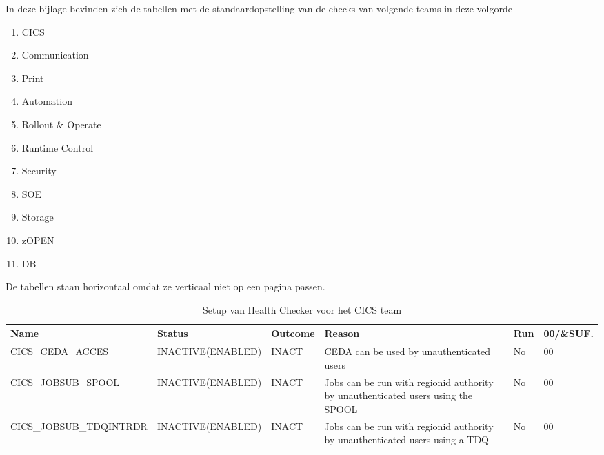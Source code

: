 
In deze bijlage bevinden zich de tabellen met de standaardopstelling van de checks van volgende teams in deze volgorde

\begin{enumerate}
	\item CICS
	\item Communication
	\item Print
	\item Automation
	\item Rollout \& Operate
	\item Runtime Control
	\item Security
	\item SOE
	\item Storage
	\item zOPEN
	\item DB
\end{enumerate}

De tabellen staan horizontaal omdat ze verticaal niet op een pagina passen.

\begin{landscape}
	\begin{table}[h]
		\begin{tabular}{|l|l|l|p{5cm}|l|l|}
			\hline
			\textbf{Name}                    & \textbf{Status}            & \textbf{Outcome} &\textbf{ Reason} & \textbf{Run} & \textbf{00/\&SUF.} \\ \hline
			CICS\_CEDA\_ACCES       & INACTIVE(ENABLED) & INACT   & CEDA   can be used by unauthenticated users                                        & No  & 00        \\ \hline
			CICS\_JOBSUB\_SPOOL     & INACTIVE(ENABLED) & INACT   & Jobs   can be run with regionid authority by unauthenticated users using the SPOOL & No  & 00        \\ \hline
			CICS\_JOBSUB\_TDQINTRDR & INACTIVE(ENABLED) & INACT   & Jobs   can be run with regionid authority by unauthenticated users using a TDQ     & No  & 00        \\ \hline
		\end{tabular}
		\caption[Health Checker Setup CICS team]{Setup van Health Checker voor het CICS team}
		\label{tbl:CICS Team tabel}
	\end{table}
\end{landscape}

